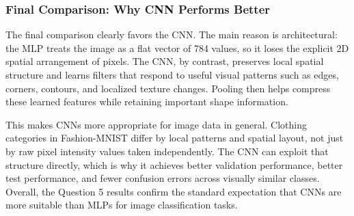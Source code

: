 \documentclass[11pt]{article}
\begin{document}
\subsubsection{Final Comparison: Why CNN Performs Better}

The final comparison clearly favors the CNN. The main reason is architectural: the MLP treats the image as a flat vector of 784 values, so it loses the explicit 2D spatial arrangement of pixels. The CNN, by contrast, preserves local spatial structure and learns filters that respond to useful visual patterns such as edges, corners, contours, and localized texture changes. Pooling then helps compress these learned features while retaining important shape information.

This makes CNNs more appropriate for image data in general. Clothing categories in Fashion-MNIST differ by local patterns and spatial layout, not just by raw pixel intensity values taken independently. The CNN can exploit that structure directly, which is why it achieves better validation performance, better test performance, and fewer confusion errors across visually similar classes. Overall, the Question 5 results confirm the standard expectation that CNNs are more suitable than MLPs for image classification tasks.
\end{document}
